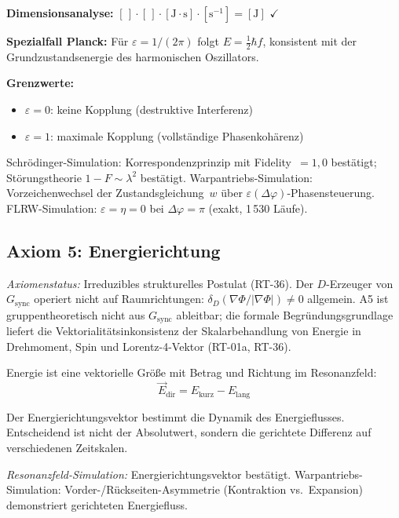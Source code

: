 \documentclass[12pt]{iopart}
\begin{document}
	\textbf{Dimensionsanalyse:}
	$[\,] \cdot [\,] \cdot [\mathrm{J{\cdot}s}] \cdot
	[\mathrm{s}^{-1}] = [\mathrm{J}]$ $\checkmark$
	
	\textbf{Spezialfall Planck:}
	F\"ur $\varepsilon = 1/(2\pi)$ folgt
	$E = \frac{1}{2}\hbar f$, konsistent mit der
	Grundzustandsenergie des harmonischen Oszillators.
	
	\textbf{Grenzwerte:}
	\begin{itemize}
		\item $\varepsilon = 0$: keine Kopplung
		(destruktive Interferenz)
		\item $\varepsilon = 1$: maximale Kopplung
		(vollst\"andige Phasenkoh\"arenz)
	\end{itemize}
	
	Schr\"odinger-Simulation: Korrespondenzprinzip mit Fidelity~$= 1{,}0$
	best\"atigt; St\"orungstheorie $1-F \sim \lambda^2$ best\"atigt.
	Warpantriebs-Simulation: Vorzeichenwechsel der Zustandsgleichung~$w$
	\"uber $\varepsilon(\Delta\varphi)$-Phasensteuerung.
	FLRW-Simulation: $\varepsilon = \eta = 0$ bei $\Delta\varphi = \pi$
	(exakt, 1\,530 L\"aufe).
	
	\subsection{Axiom 5: Energierichtung}
	
	\textit{Axiomenstatus:} Irreduzibles strukturelles Postulat (RT-36).
	Der $D$-Erzeuger von $G_{\mathrm{sync}}$ operiert nicht auf
	Raumrichtungen: $\delta_D(\nabla\Phi/|\nabla\Phi|) \neq 0$
	allgemein. A5 ist gruppentheoretisch nicht aus $G_{\mathrm{sync}}$ ableitbar;
	die formale Begr\"undungsgrundlage liefert die
	Vektorialit\"atsinkon\-sistenz der Skalarbehandlung von Energie
	in Drehmoment, Spin und Lorentz-4-Vektor (RT-01a, RT-36).
	
	Energie ist eine vektorielle Gr\"o\ss{}e mit Betrag und
	Richtung im Resonanzfeld:
	\begin{equation}
		\vec{E}_{\mathrm{dir}} =
		E_{\mathrm{kurz}} - E_{\mathrm{lang}}
		\label{eq:energy_direction}
	\end{equation}
	
	Der Energierichtungsvektor bestimmt die Dynamik des
	Energieflusses. Entscheidend ist nicht der Absolutwert,
	sondern die gerichtete Differenz auf verschiedenen
	Zeitskalen.
	
	\textit{Resonanzfeld-Simulation:}
	Energierichtungsvektor best\"atigt.
	Warpantriebs-Simulation: Vorder-/R\"uckseiten-Asymmetrie
	(Kontraktion vs.\ Expansion) demonstriert gerichteten Energiefluss.
	
\end{document}

